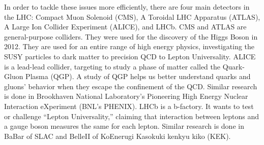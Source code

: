 In order to tackle these issues more efficiently, there are four main detectors in the LHC: Compact Muon Solenoid (CMS), A Toroidal LHC Apparatus (ATLAS), A Large Ion Collider Experiment (ALICE), and LHCb.
CMS and ATLAS are general-purpose colliders. They were used for the discovery of the Higgs Boson in 2012. They are used for an entire range of high energy physics, investigating the SUSY particles to dark matter to precision QCD to Lepton Universality.
ALICE is a lead-lead collider, targeting to study a phase of matter called the Quark-Gluon Plasma (QGP). A study of QGP helps us better understand quarks and gluons' behavior when they escape the confinement of the QCD.
Similar research is done in Brookhaven National Laboratory's Pioneering High Energy Nuclear Interaction eXperiment (BNL's PHENIX).
LHCb is a b-factory. It wants to test or challenge ``Lepton Universality,'' claiming that interaction between leptons and a gauge boson measures the same for each lepton.
Similar research is done in BaBar of SLAC and BelleII of KoEnerugi Kasokuki kenkyu kiko (KEK).

